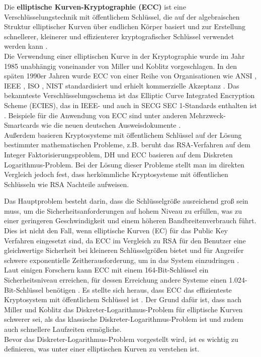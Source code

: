Die \textbf{elliptische Kurven-Kryptographie (ECC)} ist eine Verschlüsselungstechnik mit öffentlichem Schlüssel, 
die auf der algebraischen Struktur elliptischer Kurven über endlichen Körper basiert \cite{mihNita} und zur Erstellung schnellerer, kleinerer und effizienterer kryptografischer Schlüssel verwendet werden kann \cite{khan}.\\

Die Verwendung einer elliptischen Kurve in der Kryptographie wurde im Jahr 1985 unabhängig voneinander von Miller \cite{miller} und Koblitz \cite{koblitz} vorgeschlagen. In den späten 1990er Jahren wurde ECC von einer Reihe von Organisationen wie ANSI \cite{ansi}, IEEE \cite{ieee}, ISO \cite{iso}, NIST \cite{nist} standardisiert und erhielt kommerzielle Akzeptanz \cite{GaMoDa}.
Das bekannteste Verschlüsselungsschema ist das Elliptic Curve Integrated Encryption Scheme (ECIES), das in IEEE- und auch in SECG SEC 1-Standards enthalten ist \cite{marKaur}. Beispiele für die Anwendung von ECC sind unter anderen Mehrzweck-Smartcards wie die  neuen  deutschen  Ausweisdokumente \cite{merLo}.\\

Außerdem basieren Kryptosysteme mit öffentlichem Schlüssel auf der Lösung bestimmter mathematischen Probleme, z.B. beruht das RSA-Verfahren auf dem Integer Faktorisierungsproblem, DH und ECC basieren auf dem Diskreten Logarithmus-Problem. Bei der Lösung dieser Probleme stellt man im direkten Vergleich jedoch fest, dass herkömmliche Kryptosysteme mit öffentlichen Schlüsseln wie RSA Nachteile aufweisen.

Das Hauptproblem besteht darin, dass die Schlüsselgröße ausreichend groß sein muss, um die Sicherheitsanforderungen auf hohem Niveau zu erfüllen, was zu einer geringeren Geschwindigkeit und einem höheren Bandbreitenverbrauch führt.\\

Dies ist nicht den Fall, wenn elliptische Kurven (EC) für das Public Key Verfahren eingesetzt sind, da ECC im Vergleich zu RSA für den Benutzer eine gleichwertige Sicherheit bei kleineren Schlüsselgrößen bietet und für Angreifer schwere exponentielle Zeitherausforderung, um in das System einzudringen \cite{GaMoDa}.\\

Laut einigen Forschern kann ECC mit einem 164-Bit-Schlüssel ein Sicherheitsniveau erreichen, für dessen Erreichung andere Systeme einen 1.024-Bit-Schlüssel benötigen \cite{khan}. Es stellte sich heraus, dass ECC das effizienteste Kryptosystem mit öffentlichem Schlüssel ist \cite{naRaj}.
Der Grund dafür ist, dass nach Miller und Koblitz das Diskreter-Logarithmus-Problem für elliptische Kurven schwerer sei, als das klassische Diskreter-Logarithmus-Problem ist und zudem auch schnellere Laufzeiten ermögliche.\\
Bevor das Diskreter-Logarithmus-Problem vorgestellt wird, ist es wichtig zu definieren, was unter einer elliptischen Kurven zu verstehen ist. 

